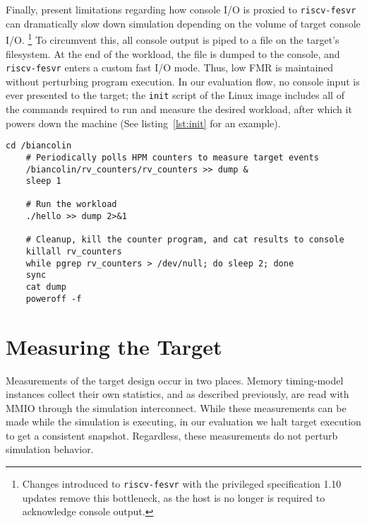 Finally, present limitations regarding how console I/O is proxied to
\texttt{riscv-fesvr} can dramatically slow down simulation depending on the
volume of target console I/O. \footnote{Changes introduced to
\texttt{riscv-fesvr} with the privileged specification 1.10 updates remove this
bottleneck, as the host is no longer is required to acknowledge console
output.} To circumvent this, all console output is piped to a file on the
target's filesystem. At the end of the workload, the file is dumped to the
console, and \texttt{riscv-fesvr} enters a custom fast I/O mode.  Thus, low FMR
is maintained without perturbing program execution. In our evaluation flow, no
console input is ever presented to the target; the \texttt{init} script of the
Linux image includes all of the commands required to run and measure the
desired workload, after which it powers down the machine (See listing~\ref{lst:init} for an example).\\


\lstset{style=init}

\begin{lstlisting}[caption={An example init script generated during the build process},label={lst:init}]
    cd /biancolin
    # Periodically polls HPM counters to measure target events
    /biancolin/rv_counters/rv_counters >> dump &
    sleep 1

    # Run the workload
    ./hello >> dump 2>&1

    # Cleanup, kill the counter program, and cat results to console
    killall rv_counters
    while pgrep rv_counters > /dev/null; do sleep 2; done
    sync
    cat dump
    poweroff -f
\end{lstlisting}

\section{Measuring the Target}

Measurements of the target design occur in two places.
Memory timing-model instances collect their own statistics, and
as described previously, are read with MMIO through the simulation
interconnect. While these measurements can be made while the simulation is
executing, in our evaluation we halt target execution to get a consistent
snapshot. Regardless, these measurements do not perturb simulation behavior.

